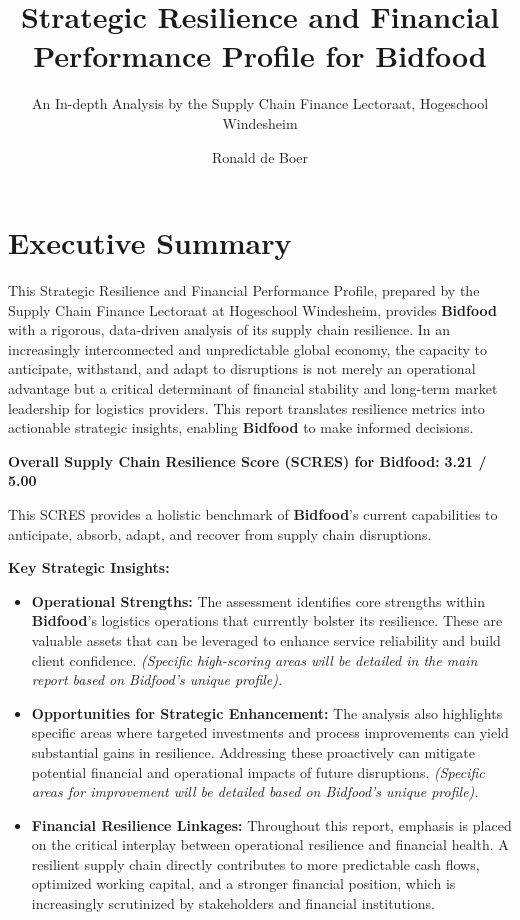 \documentclass[
  oneside,
  open=any,
  fontsize=11pt]{scrbook}
\title{Strategic Resilience and Financial Performance Profile for
Bidfood}
\subtitle{An In-depth Analysis by the Supply Chain Finance Lectoraat,
Hogeschool Windesheim}
\author{Ronald de Boer}
\date{}
\providecommand{\tightlist}{%
  \setlength{\itemsep}{0pt}\setlength{\parskip}{0pt}}
\renewcommand*\contentsname{Table of contents}
\newcommand\contentsname{Table of contents}
\begin{document}
\frontmatter
\maketitle

\renewcommand*\contentsname{Table of contents}
{
\setcounter{tocdepth}{2}
\tableofcontents
}
\listoffigures
\listoftables

\mainmatter
\newpage

\chapter{Executive Summary}\label{executive-summary}

This Strategic Resilience and Financial Performance Profile, prepared by
the Supply Chain Finance Lectoraat at Hogeschool Windesheim, provides
\textbf{Bidfood} with a rigorous, data-driven analysis of its supply
chain resilience. In an increasingly interconnected and unpredictable
global economy, the capacity to anticipate, withstand, and adapt to
disruptions is not merely an operational advantage but a critical
determinant of financial stability and long-term market leadership for
logistics providers. This report translates resilience metrics into
actionable strategic insights, enabling \textbf{Bidfood} to make
informed decisions.

\textbf{Overall Supply Chain Resilience Score (SCRES) for Bidfood:}
\textbf{3.21 / 5.00}

This SCRES provides a holistic benchmark of \textbf{Bidfood}'s current
capabilities to anticipate, absorb, adapt, and recover from supply chain
disruptions.

\textbf{Key Strategic Insights:}

\begin{itemize}
\tightlist
\item
  \textbf{Operational Strengths:} The assessment identifies core
  strengths within \textbf{Bidfood}'s logistics operations that
  currently bolster its resilience. These are valuable assets that can
  be leveraged to enhance service reliability and build client
  confidence. \emph{(Specific high-scoring areas will be detailed in the
  main report based on Bidfood's unique profile).}
\item
  \textbf{Opportunities for Strategic Enhancement:} The analysis also
  highlights specific areas where targeted investments and process
  improvements can yield substantial gains in resilience. Addressing
  these proactively can mitigate potential financial and operational
  impacts of future disruptions. \emph{(Specific areas for improvement
  will be detailed based on Bidfood's unique profile).}
\item
  \textbf{Financial Resilience Linkages:} Throughout this report,
  emphasis is placed on the critical interplay between operational
  resilience and financial health. A resilient supply chain directly
  contributes to more predictable cash flows, optimized working capital,
  and a stronger financial position, which is increasingly scrutinized
  by stakeholders and financial institutions.
\end{itemize}
\end{document}

